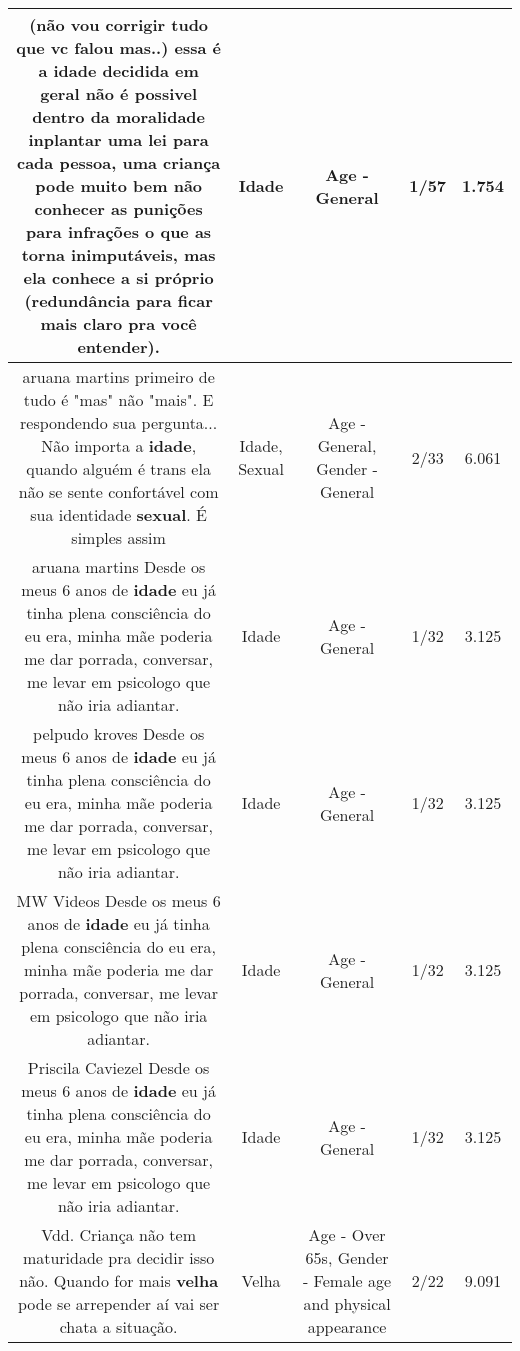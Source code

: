 \documentclass[11pt]{article}
\newlength\mylength
\begin{document}
\begin{center}
\begin{longtable}{|C{.65\mylength}|C{.30\mylength}|C{.12\mylength}|C{.12\mylength}|C{.12\mylength}|}
  \small (não vou corrigir tudo que vc falou mas..) essa é a \textbf{idade} decidida em geral não é possivel dentro da moralidade inplantar uma lei para cada pessoa, uma criança pode muito bem não conhecer as punições para infrações o que as torna inimputáveis,  mas ela conhece a si próprio (redundância para ficar mais claro pra você entender).\normalsize   & Idade & Age - General & 1/57 & 1.754 \\  \hline
  \small aruana martins primeiro de tudo é "mas" não "mais". E respondendo sua pergunta... Não importa a \textbf{idade}, quando alguém é trans ela não se sente confortável com sua identidade \textbf{sexual}. É simples assim\normalsize   & Idade, Sexual & Age - General, Gender - General & 2/33 & 6.061 \\  \hline
  \small aruana martins Desde os meus 6 anos de \textbf{idade} eu já tinha plena consciência do eu era, minha mãe poderia me dar porrada, conversar, me levar em psicologo que não iria adiantar.\normalsize   & Idade & Age - General & 1/32 & 3.125 \\  \hline
  \small pelpudo kroves Desde os meus 6 anos de \textbf{idade} eu já tinha plena consciência do eu era, minha mãe poderia me dar porrada, conversar, me levar em psicologo que não iria adiantar.\normalsize   & Idade & Age - General & 1/32 & 3.125 \\  \hline
  \small MW Videos Desde os meus 6 anos de \textbf{idade} eu já tinha plena consciência do eu era, minha mãe poderia me dar porrada, conversar, me levar em psicologo que não iria adiantar.\normalsize   & Idade & Age - General & 1/32 & 3.125 \\  \hline
  \small Priscila Caviezel Desde os meus 6 anos de \textbf{idade} eu já tinha plena consciência do eu era, minha mãe poderia me dar porrada, conversar, me levar em psicologo que não iria adiantar.\normalsize   & Idade & Age - General & 1/32 & 3.125 \\  \hline
  \small Vdd.  Criança não tem maturidade pra decidir isso não.  Quando for mais \textbf{v\textbf{elha}} pode se arrepender aí vai ser chata a situação.\normalsize   & Velha & Age - Over 65s, Gender - Female age and physical appearance & 2/22 & 9.091 \\  \hline

\end{longtable}
\end{center}
\end{document}
